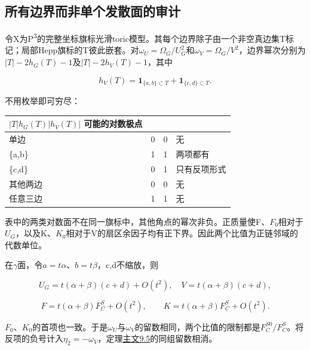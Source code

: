 \documentclass[11pt,a4paper,oneside]{ctexart}
\theoremstyle{cnplain}
\theoremstyle{definition}
\theoremstyle{remark}
\numberwithin{equation}{section}
\newcommand{\otherref}[2]{\href{#1.pdf}{#2}}
\begin{document}
\subsection{所有边界而非单个发散面的审计}\label{sec:forest:4}

令X为P\textsuperscript{3}的完整坐标旗标光滑toric模型。其每个边界除子由一个非空真边集T标记；局部Hepp旗标的T彼此嵌套。对\(\omega _U=\Omega _G/U_G^{2}\)和\(\omega _V=\Omega _G/V^{2}\)，边界幂次分别为\(|T|- 2h_G(T)- 1\)及\(|T|- 2h_V(T)- 1\)，其中

\begin{equation}
h_V(T)=\mathbf1_{\{a,b\}\subset T}+\mathbf1_{\{c,d\}\subset T}.
\end{equation}

不用枚举即可穷尽：

{\def\LTcaptype{none} %
\begin{longtable}[]{@{}lrrl@{}}
\toprule\noalign{}
\(| T | h_G(T) | h_V(T) |\) 可能的对数极点 & & & \\
\midrule\noalign{}
\endhead
\bottomrule\noalign{}
\endlastfoot
单边 & 0 & 0 & 无 \\
\{a,b\} & 1 & 1 & 两项都有 \\
\{c,d\} & 0 & 1 & 只有反项形式 \\
其他两边 & 0 & 0 & 无 \\
任意三边 & 1 & 1 & 无 \\
\end{longtable}
}

表中的两类对数面不在同一旗标中，其他角点的幂次非负。正质量使F、\(F_0\)相对于\(U_G\)，以及K、\(K_0\)相对于V的扇区余因子均有正下界。因此两个比值为正链邻域的代数单位。

在\(\gamma \)面，令\(a=t\alpha \)、\(b=t\beta \)，c,d不缩放，则

\begin{equation}
U_G=t(\alpha+\beta)(c+d)+O(t^2),\quad
 V=t(\alpha+\beta)(c+d),
\end{equation}

\begin{equation}
F=t(\alpha+\beta)F_C^S+O(t^2),\qquad
 K=t(\alpha+\beta)F_C^S+O(t^2).                                 \label{eq:forest:15}
\end{equation}

\(F_0\)、\(K_0\)的首项也一致。于是\(\omega _U\)与\(\omega _V\)的留数相同，两个比值的限制都是\(F_C^{S0}/F_C^S\)。将反项的负号计入\(\eta _2=- \omega _V\)，定理\otherref{feynman_periods_long_paper}{主文9.5}的同组留数相消。
\end{document}
